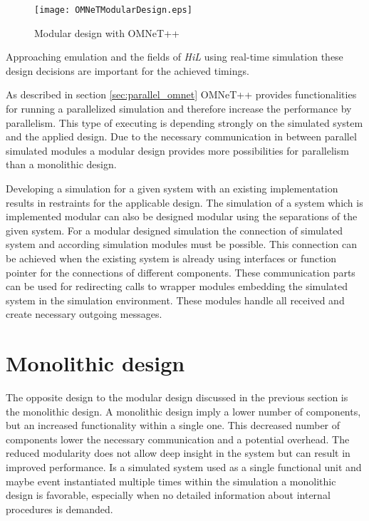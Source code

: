 \begin{figure}
    \centering
    \texttt{[image: OMNeTModularDesign.eps]}
    \caption{Modular design with OMNeT++}
    \label{fig:OMNeTModularDesign}
\end{figure}

Approaching emulation and the fields of \emph{HiL} using real-time simulation these design decisions are important for the achieved timings.

As described in section \ref{sec:parallel_omnet} OMNeT++ provides functionalities for running a parallelized simulation and therefore increase the performance by parallelism.
This type of executing is depending strongly on the simulated system and the applied design.
Due to the necessary communication in between parallel simulated modules a modular design provides more possibilities for parallelism than a monolithic design.

Developing a simulation for a given system with an existing implementation results in restraints for the applicable design.
The simulation of a system which is implemented modular can also be designed modular using the separations of the given system.
For a modular designed simulation the connection of simulated system and according simulation modules must be possible.
This connection can be achieved when the existing system is already using interfaces or function pointer for the connections of different components.
These communication parts can be used for redirecting calls to wrapper modules embedding the simulated system in the simulation environment.
These modules handle all received and create necessary outgoing messages.

\section{Monolithic design}
\label{sec:design_monolithic}
The opposite design to the modular design discussed in the previous section is the monolithic design.
A monolithic design imply a lower number of components, but an increased functionality within a single one.
This decreased number of components lower the necessary communication and a potential overhead.
The reduced modularity does not allow deep insight in the system but can result in improved performance.
Is a simulated system used as a single functional unit and maybe event instantiated multiple times within the simulation a monolithic design is favorable, especially when no detailed information about internal procedures is demanded.

